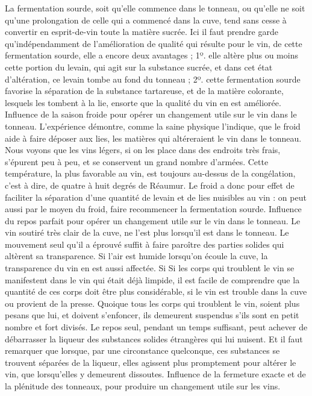 La fermentation sourde, soit qu'elle commence dans le tonneau, ou qu'elle ne soit qu'une prolongation de celle qui a commencé dans la cuve, tend sans cesse à convertir en esprit-de-vin toute la matière sucrée. Ici il faut prendre garde qu'indépendamment de l'amélioration de qualité qui résulte pour le vin, de cette fermentation sourde, elle a encore deux avantages ; 1º. elle altère plus ou moins cette portion du levain, qui agit sur la substance sucrée, et dans cet état d'altération, ce levain tombe au fond du tonneau ; 2º. cette fermentation sourde favorise la séparation de la substance tartareuse, et de la matière colorante, lesquels les tombent à la lie, ensorte que la qualité du vin en est améliorée.\setcounter{page}{320} Influence de la saison froide pour opérer un changement utile sur le vin dans le tonneau.
L'expérience démontre, comme la saine physique l'indique, que le froid aide à faire déposer aux lies, les matières qui altéreraient le vin dans le tonneau.
Nous voyons que les vins légers, si on les place dans des endroits très frais, s'épurent peu à peu, et se conservent un grand nombre d'armées. Cette température, la plus favorable au vin, est toujours au-dessus de la congélation, c'est à dire, de quatre à huit degrés de Réaumur. Le froid a donc pour effet de faciliter la séparation d'une quantité de levain et de lies nuisibles au vin : on peut aussi par le moyen du froid, faire recommencer la fermentation sourde.
Influence du repos parfait pour opérer un changement utile sur le vin dans le tonneau.
Le vin soutiré très clair de la cuve, ne l'est plus lorsqu'il est dans le tonneau. Le mouvement seul qu'il a éprouvé suffit à faire paroître des parties solides qui altèrent sa transparence.
Si l'air est humide lorsqu'on écoule la cuve, la transparence du vin en est aussi affectée.
Si\setcounter{page}{321} Si les corps qui troublent le vin se manifestent dans le vin qui était déjà limpide, il est facile de comprendre que la quantité de ces corps doit être plus considérable, si le vin est trouble dans la cuve ou provient de la presse.
Quoique tous les corps qui troublent le vin, soient plus pesans que lui, et doivent s'enfoncer, ils demeurent suspendus s'ils sont en petit nombre et fort divisés. Le repos seul, pendant un temps suffisant, peut achever de débarrasser la liqueur des substances solides étrangères qui lui nuisent. Et il faut remarquer que lorsque, par une circonstance quelconque, ces substances se trouvent séparées de la liqueur, elles agissent plus promptement pour altérer le vin, que lorsqu'elles y demeurent dissoutes.
Influence de la fermeture exacte et de la plénitude des tonneaux, pour produire un changement utile sur les vins.
